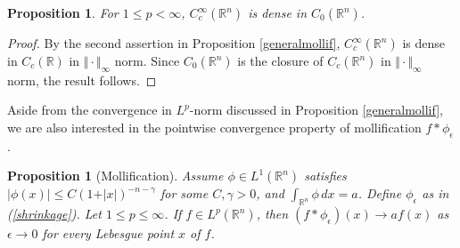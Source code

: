 \documentclass{article}
\numberwithin{equation}{section}
\newcommand{\bbR}{\mathbb{R}}
\theoremstyle{plain}
\newtheorem{proposition}[theorem]{Proposition}
\theoremstyle{definition}
\begin{document}
\begin{proposition}\label{ccdenseinc0}
	For $1\leq p <\infty$, $C_c^\infty(\mathbb{R}^n)$ is dense in $C_0(\bbR^n)$.
\end{proposition}
\begin{proof}
By the second assertion in Proposition \ref{generalmollif}, $C^\infty_c(\bbR^n)$ is dense in $C_c(\bbR)$ in $\Vert\cdot\Vert_\infty$ norm. Since $C_0(\bbR^n)$ is the closure of $C_c(\bbR^n)$ in $\Vert\cdot\Vert_\infty$ norm, the result follows.
\end{proof}

Aside from the convergence in $L^p$-norm discussed in Proposition \ref{generalmollif}, we are also interested in the pointwise convergence property of mollification $f*\phi_\epsilon$.

\begin{proposition}[Mollification]\label{pwconvgmollif}
Assume $\phi\in L^1(\bbR^n)$ satisfies $\vert\phi(x)\vert\leq C(1+\vert x\vert)^{-n-\gamma}$ for some $C,\gamma>0$, and $\int_{\bbR^n}\phi\,dx=a$. Define $\phi_\epsilon$ as in (\ref{shrinkage}). Let $1\leq p\leq\infty$. If $f\in L^p(\bbR^n)$, then $(f*\phi_\epsilon)(x)\to af(x)$ as $\epsilon\to 0$ for every Lebesgue point $x$ of $f$.
\end{proposition}
\end{document}
